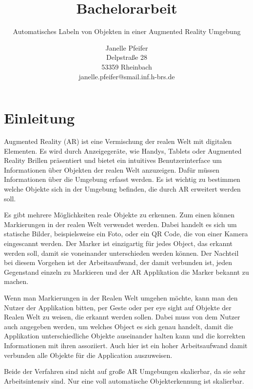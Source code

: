 \documentclass[german,a4paper, 12pt]{llncs}
\title{Bachelorarbeit}
\subtitle{Automatisches Labeln von Objekten in einer Augmented Reality Umgebung}
\author{\parbox{.9\textwidth}{\centering 
		\large Janelle Pfeifer \\
		\small Delpstraße 28\\
		53359 Rheinbach \\
		janelle.pfeifer@smail.inf.h-brs.de}}
\institute{\parbox{.9\textwidth}{\centering 
		\large Hochschule Bonn-Rhein-Sieg \\
		\normalsize Institute of Visual Computing \\ 
		\small Fachbereich Informatik \\
		Studiengang: Informatik (B.SC.)\\
		\phantom{.}\\
		\normalsize Erstprüfer: Prof. Dr. Ernst Kruijff\\
		\normalsize Zweitprüfer: Prof. Dr. André Hinkenjann\\
		\phantom{.}\\
		\normalsize Rheinbach, 1.10.2020}}
\begin{document}
	
	\maketitle
	\newpage
	\tableofcontents
	\newpage
	
\section{Einleitung}

Augmented Reality (AR) ist eine Vermischung der realen Welt mit digitalen Elementen. Es wird durch Anzeigegeräte, wie Handys, Tablets oder Augmented Reality Brillen präsentiert und bietet ein intuitives Benutzerinterface um Informationen über Objekten der realen Welt anzuzeigen. Dafür müssen Informationen über die Umgebung erfasst werden. Es ist wichtig zu bestimmen welche Objekte sich in der Umgebung befinden, die durch AR erweitert werden soll.

Es gibt mehrere Möglichkeiten reale Objekte zu erkennen. Zum einen können Markierungen in der realen Welt verwendet werden. Dabei handelt es sich um statische Bilder, beispielsweise ein Foto, oder ein QR Code, die von einer Kamera eingescannt werden. Der Marker ist einzigartig für jedes Object, das erkannt werden soll, damit sie voneinander unterschieden werden können. Der Nachteil bei diesem Vorgehen ist der Arbeitsaufwand, der damit verbunden ist, jeden Gegenstand einzeln zu Markieren und der AR Applikation die Marker bekannt zu machen. 

Wenn man Markierungen in der Realen Welt umgehen möchte, kann man den Nutzer der Applikation bitten, per Geste oder per eye sight auf Objekte der Realen Welt zu weisen, die erkannt werden sollen. Dabei muss von dem Nutzer auch angegeben werden, um welches Object es sich genau handelt, damit die Applikation unterschiedliche Objekte auseinander halten kann und die korrekten Informationen mit ihren assoziiert. Auch hier ist ein hoher Arbeitsaufwand damit verbunden alle Objekte für die Application auszuweisen. 

Beide der Verfahren sind nicht auf große AR Umgebungen skalierbar, da sie sehr Arbeitsintensiv sind. Nur eine voll automatische Objekterkennung ist skalierbar. 
\end{document}
